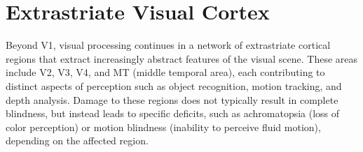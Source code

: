 \section{Extrastriate Visual Cortex}
\label{sec:extrastriate}

Beyond V1, visual processing continues in a network of extrastriate cortical regions
that extract increasingly abstract features of the visual scene. These areas include
V2, V3, V4, and MT (middle temporal area), each contributing to distinct aspects of
perception such as object recognition, motion tracking, and depth analysis. Damage
to these regions does not typically result in complete blindness, but instead leads to
specific deficits, such as achromatopsia (loss of color perception) or motion blindness
(inability to perceive fluid motion), depending on the affected region.
